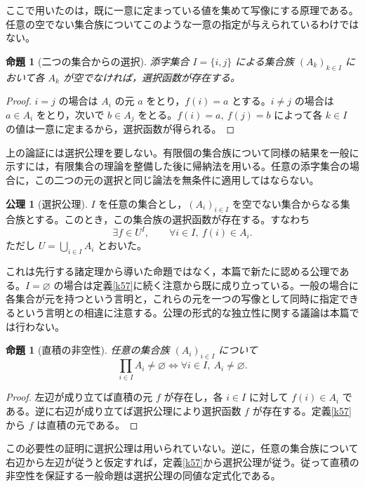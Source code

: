 \documentclass[a5paper,10pt,dvipdfmx]{jsarticle}
\theoremstyle{definition}
\newtheorem{ax}[ruledef]{公理}
\theoremstyle{plain}
\newtheorem{prop}[ruledef]{命題}
\newcommand{\iffc}{\Longleftrightarrow}
\begin{document}
ここで用いたのは，既に一意に定まっている値を集めて写像にする原理である。任意の空でない集合族についてこのような一意の指定が与えられているわけではない。
\begin{prop}[二つの集合からの選択]\label{k59}
添字集合 $I=\{i,j\}$ による集合族 $(A_k)_{k\in I}$ において各 $A_k$ が空でなければ，選択函数が存在する。
\end{prop}
\begin{proof}
$i=j$ の場合は $A_i$ の元 $a$ をとり，$f(i)=a$ とする。$i\ne j$ の場合は $a\in A_i$ をとり，次いで $b\in A_j$ をとる。$f(i)=a,\ f(j)=b$ によって各 $k\in I$ の値は一意に定まるから，選択函数が得られる。
\end{proof}
上の論証には選択公理を要しない。有限個の集合族について同様の結果を一般に示すには，有限集合の理論を整備した後に帰納法を用いる。任意の添字集合の場合に，この二つの元の選択と同じ論法を無条件に適用してはならない。
\begin{ax}[選択公理]\label{k60}
$I$ を任意の集合とし，$(A_i)_{i\in I}$ を空でない集合からなる集合族とする。このとき，この集合族の選択函数が存在する。すなわち
\[
 \exists f\in U^I,
 \qquad \forall i\in I,\ f(i)\in A_i.
\]
ただし $U=\bigcup_{i\in I}A_i$ とおいた。
\end{ax}
これは先行する諸定理から導いた命題ではなく，本篇で新たに認める公理である。$I=\varnothing$ の場合は定義\ref{k57}に続く注意から既に成り立っている。一般の場合に各集合が元を持つという言明と，これらの元を一つの写像として同時に指定できるという言明との相違に注意する。公理の形式的な独立性に関する議論は本篇では行わない。
\begin{prop}[直積の非空性]\label{k61}
任意の集合族 $(A_i)_{i\in I}$ について
\[
 \prod_{i\in I}A_i\ne\varnothing
 \iffc \forall i\in I,\ A_i\ne\varnothing.
\]
\end{prop}
\begin{proof}
左辺が成り立てば直積の元 $f$ が存在し，各 $i\in I$ に対して $f(i)\in A_i$ である。逆に右辺が成り立てば選択公理により選択函数 $f$ が存在する。定義\ref{k57}から $f$ は直積の元である。
\end{proof}
この必要性の証明に選択公理は用いられていない。逆に，任意の集合族について右辺から左辺が従うと仮定すれば，定義\ref{k57}から選択公理が従う。従って直積の非空性を保証する一般命題は選択公理の同値な定式化である。
\end{document}
